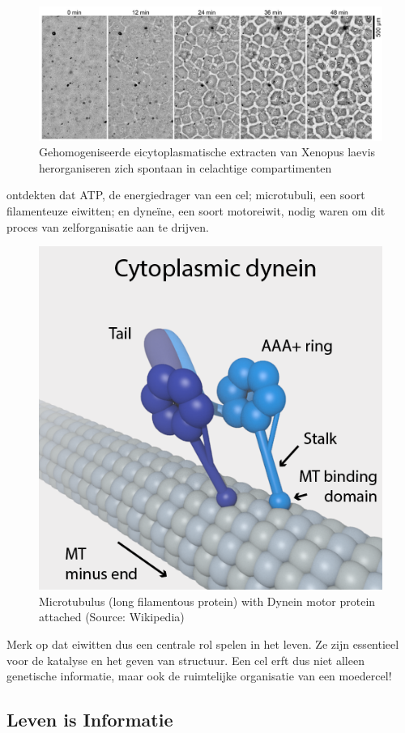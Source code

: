 \documentclass[
  11pt,
]{book}
\begin{document}
\begin{figure}

{\centering \includegraphics[width=1\linewidth]{./figs/selforganisation} 

}

\caption{Gehomogeniseerde eicytoplasmatische extracten van Xenopus laevis herorganiseren zich spontaan in celachtige compartimenten \citep{Cheng2019}}\label{fig:selforganisation}
\end{figure}

\citet{Cheng2019} ontdekten dat ATP, de energiedrager van een cel; microtubuli, een soort filamenteuze eiwitten; en dyneïne, een soort motoreiwit, nodig waren om dit proces van zelforganisatie aan te drijven.

\begin{figure}

{\centering \includegraphics[width=0.3\linewidth]{./figs/DyneinHeavyChainOnMT} 

}

\caption{Microtubulus (long filamentous protein) with Dynein motor protein attached (Source:  Wikipedia)}\label{fig:dynein}
\end{figure}

Merk op dat eiwitten dus een centrale rol spelen in het leven. Ze zijn essentieel voor de katalyse en het geven van structuur. Een cel erft dus niet alleen genetische informatie, maar ook de ruimtelijke organisatie van een moedercel!

\hypertarget{lifeInformation}{%
\subsection{Leven is Informatie}\label{lifeInformation}}
\end{document}
